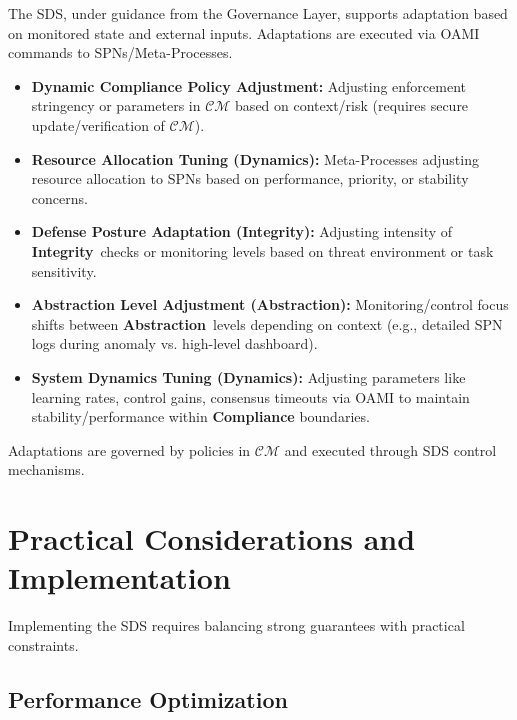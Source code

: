 \documentclass[12pt,a4paper]{report}
\newcommand{\Integrity}{\textbf{Integrity}}
\newcommand{\Abstraction}{\textbf{Abstraction}}
\newcommand{\Dynamics}{\textbf{Dynamics}}
\begin{document}
	The SDS, under guidance from the Governance Layer, supports adaptation based on monitored state and external inputs. Adaptations are executed via OAMI commands to SPNs/Meta-Processes.
	\begin{itemize}[noitemsep]
		\item \textbf{Dynamic Compliance Policy Adjustment:} Adjusting enforcement stringency or parameters in $\mathcal{CM}$ based on context/risk (requires secure update/verification of $\mathcal{CM}$).
		\item \textbf{Resource Allocation Tuning (\Dynamics):} Meta-Processes adjusting resource allocation to SPNs based on performance, priority, or stability concerns.
		\item \textbf{Defense Posture Adaptation (\Integrity):} Adjusting intensity of \Integrity\ checks or monitoring levels based on threat environment or task sensitivity.
		\item \textbf{Abstraction Level Adjustment (\Abstraction):} Monitoring/control focus shifts between \Abstraction\ levels depending on context (e.g., detailed SPN logs during anomaly vs. high-level dashboard).
		\item \textbf{System Dynamics Tuning (\Dynamics):} Adjusting parameters like learning rates, control gains, consensus timeouts via OAMI to maintain stability/performance within \textbf{Compliance} boundaries.
	\end{itemize}
	Adaptations are governed by policies in $\mathcal{CM}$ and executed through SDS control mechanisms.
	
	\section{Practical Considerations and Implementation} %
	\label{sec:4-6} %
	
	Implementing the SDS requires balancing strong guarantees with practical constraints.
	
	\subsection{Performance Optimization} %
	\label{sec:4-6-1} %
	
\end{document}
